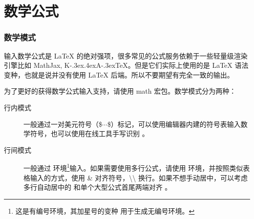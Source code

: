 \section{数学公式}
\begin{frame}
  \frametitle{数学模式}
  \begin{alertblock}{}
  输入数学公式是 \LaTeX{} 的绝对强项，很多常见的公式服务依赖于一些轻量级渲染引擎比如 MathJax, K\kern-.3ex\raise.4ex\hbox{\footnotesize A}\kern-.3ex\TeX{}。但是它们实际上使用的是 \LaTeX{} 语法变种，也就是说并没有使用 \LaTeX{} 后端。所以不要期望有完全一致的输出。
  \end{alertblock}
  
  为了更好的获得数学公式输入支持，请使用 math 宏包。数学模式分为两种：
  \begin{description}
    \item[行内模式] 一般通过一对美元符号（\$$\cdots$\$）标记，可以使用编辑器内建的符号表输入数学符号，也可以使用在线工具手写识别 。
    \item[行间模式] 一般通过  环境\footnote{这是有编号环境，其加星号的变种  用于生成无编号环境。}输入。如果需要使用多行公式，请使用  环境，并按照类似表格输入的方式，使用 \& 对齐符号，\textbackslash\textbackslash{} 换行。如果不想手动居中，可以考虑多行自动居中的  和单个大型公式首尾两端对齐 。
  \end{description}
\end{frame}

